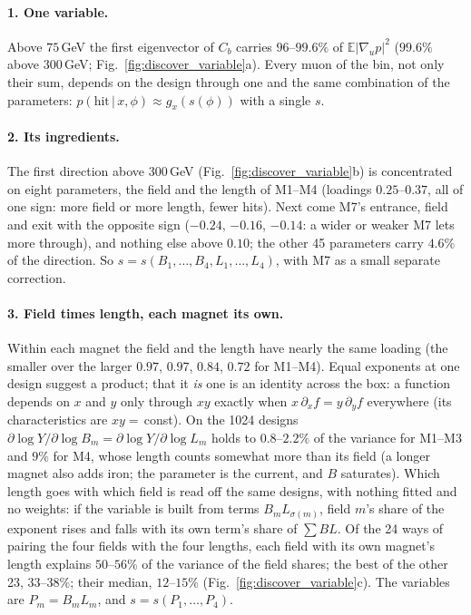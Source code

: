 \documentclass[11pt,a4paper]{article}
\begin{document}
\paragraph{1. One variable.}
Above $75$\,GeV the first eigenvector of $C_b$ carries $96$--$99.6\%$ of
$\mathbb{E}|\nabla_up|^2$ ($99.6\%$ above $300$\,GeV; Fig.~\ref{fig:discover_variable}a). Every
muon of the bin, not only their sum, depends on the design through one and the same combination
of the parameters: $p(\text{hit}\,|\,x,\phi)\approx g_x(s(\phi))$ with a single $s$.

\paragraph{2. Its ingredients.}
The first direction above $300$\,GeV (Fig.~\ref{fig:discover_variable}b) is concentrated on eight
parameters, the field and the length of M1--M4 (loadings $0.25$--$0.37$, all of one sign: more
field or more length, fewer hits). Next come M7's entrance, field and exit with the opposite sign
($-0.24$, $-0.16$, $-0.14$: a wider or weaker M7 lets more through), and nothing else above
$0.10$; the other 45 parameters carry $4.6\%$ of the direction. So
$s=s(B_1,\dots,B_4,L_1,\dots,L_4)$, with M7 as a small separate correction.

\paragraph{3. Field times length, each magnet its own.}
Within each magnet the field and the length have nearly the same loading (the smaller over the
larger $0.97$, $0.97$, $0.84$, $0.72$ for M1--M4). Equal exponents at one design suggest a product;
that it \emph{is} one is an identity across the box: a function depends on $x$ and $y$ only through
$xy$ exactly when $x\,\partial_xf=y\,\partial_yf$ everywhere (its characteristics are $xy=$\,const).
On the 1024 designs $\partial\log Y/\partial\log B_m=\partial\log Y/\partial\log L_m$ holds to
$0.8$--$2.2\%$ of the variance for M1--M3 and $9\%$ for M4, whose length counts somewhat more than
its field (a longer magnet also adds iron; the parameter is the current, and $B$ saturates). Which
length goes with which field is read off the same designs, with nothing fitted and no weights: if
the variable is built from terms $B_mL_{\sigma(m)}$, field $m$'s share of the exponent rises and
falls with its own term's share of $\sum BL$. Of the 24 ways of pairing the four fields with the
four lengths, each field with its own magnet's length explains $50$--$56\%$ of the variance of the
field shares; the best of the other 23, $33$--$38\%$; their median, $12$--$15\%$
(Fig.~\ref{fig:discover_variable}c). The variables are $P_m=B_mL_m$, and $s=s(P_1,\dots,P_4)$.
\end{document}
